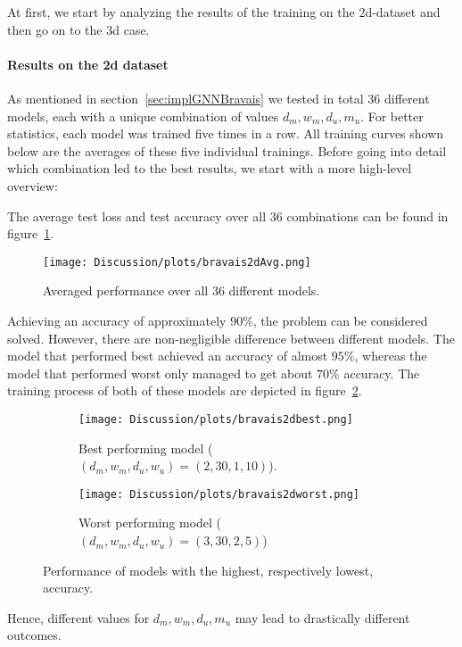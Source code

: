 At first, we start by analyzing the results of the training on the 2d-dataset and then go on to the 3d case.

\paragraph{Results on the 2d dataset}
As mentioned in section~\ref{sec:implGNNBravais} we tested in total 36 different models, each with a unique combination of values $d_m,w_m,d_u,m_u$.
For better statistics, each model was trained five times in a row.
All training curves shown below are the averages of these five individual trainings.
Before going into detail which combination led to the best results, we start 
with a more high-level overview:

The average test loss and test accuracy over all 36 combinations can be found in figure~\ref{fig:avgBravais2d}.
\begin{figure}[h]
    \centering
    \texttt{[image: Discussion/plots/bravais2dAvg.png]}
    \caption{Averaged performance over all 36 different models.}
    \label{fig:avgBravais2d}
\end{figure}
Achieving an accuracy of approximately $90\%$, the problem can be considered solved. 
However, there are non-negligible difference between different models. 
The model that performed best achieved an accuracy of almost $95\%$, whereas the model that performed worst
only managed to get about $70\%$ accuracy. The training process of both of these models are depicted in figure~\ref{fig:bravais2dBestWorst}.
\begin{figure}[h]
    \centering
    \begin{subfigure}[t]{0.45\textwidth}
        \centering
        \texttt{[image: Discussion/plots/bravais2dbest.png]}
        \caption{Best performing model ($(d_m,w_m,d_u,w_u)=(2, 30, 1, 10)$).}
    \end{subfigure}
    \hfill
    \begin{subfigure}[t]{0.45\textwidth}
        \centering
        \texttt{[image: Discussion/plots/bravais2dworst.png]}
        \caption{Worst performing model ($(d_m,w_m,d_u,w_u)=(3, 30, 2, 5)$)}
    \end{subfigure}
    \caption{Performance of models with the highest, respectively lowest, accuracy.}
    \label{fig:bravais2dBestWorst}    
\end{figure}
Hence, different values for $d_m,w_m,d_u,m_u$ may lead to drastically different outcomes. 

